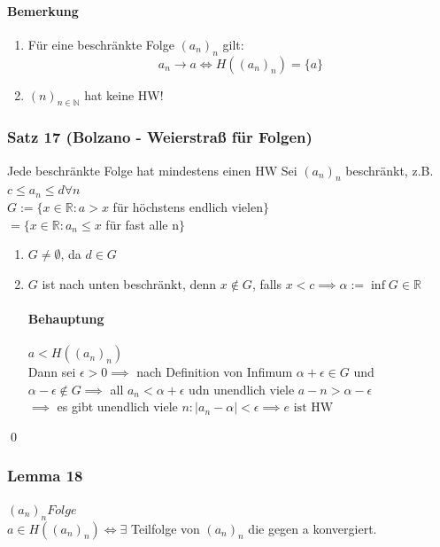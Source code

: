 \documentclass[fleqn]{scrartcl}
\renewenvironment{proof}{{\bfseries Beweis }}{\qed}
\begin{document}
\paragraph{Bemerkung}
\begin{enumerate}[1)]
\item Für eine beschränkte Folge $(a_n)_n$ gilt: $$a_n \rightarrow a \Leftrightarrow H((a_n)_n) = \{a\}$$
\item $(n)_{n\in\mathbb{N}}$ hat keine HW!
\end{enumerate}
\subsubsection{Satz 17 (Bolzano - Weierstraß für Folgen)} Jede beschränkte Folge hat mindestens einen HW
\begin{proof}
Sei $(a_n)_n$ beschränkt, z.B. $c \leq a_n \leq d \forall n$\\
$G := \{ x\in\mathbb{R}: a > x$ für höchstens endlich vielen$\}$\\
$=\{x\in\mathbb{R}: a_n \leq x$ für fast alle n$\}$
\begin{enumerate}
\item $G \neq \emptyset$, da $d \in G$
\item $G$ ist nach unten beschränkt, denn $x \notin G$, falls $x < c \implies \alpha := \inf G \in \mathbb{R}$\\
\paragraph{Behauptung} $a < H((a_n)_n)$\\
Dann sei $\epsilon > 0 \implies$ nach Definition von Infimum $\alpha + \epsilon \in G$ und $\alpha - \epsilon \notin G \implies$ all $a_n < \alpha + \epsilon$ udn unendlich viele $a-n > \alpha - \epsilon$\\
$\implies$ es gibt unendlich viele $n: |a_n - \alpha| < \epsilon \implies e \text{ ist HW}$
\end{enumerate}
\end{proof}
\subsubsection{Lemma 18} $(a_n)_n Folge$\\
$a \in H((a_n)_n) \Leftrightarrow \exists$ Teilfolge von $(a_n)_n$ die gegen a konvergiert.
\end{document}
